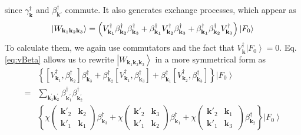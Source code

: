 \documentclass[aps,prb,superscriptaddress,showpacs,reprint,lengthcheck]{revtex4}
\newcommand{\vk}{\ensuremath{\mathbf{k}}}
\begin{document}
since $\gamma^{\dagger}_{\mathbf{k}}$ and $\beta^{\dagger}_{\mathbf{k}'}$ commute.  It also generates exchange processes, which appear as 
\begin{equation}
\left|W_{\mathbf{k} _1\mathbf{k} _2\mathbf{k} _3}\right> =\left(V^{\dagger}_{\mathbf{k} _1}\beta^{\dagger}_{\mathbf{k}
_2}\beta^{\dagger}_{\mathbf{k} _3}+\beta^{\dagger}_{\mathbf{k}
_1}V^{\dagger}_{\mathbf{k} _2}\beta^{\dagger}_{\mathbf{k} _3}+\beta^{%
\dagger}_{\mathbf{k} _1}\beta^{\dagger}_{\mathbf{k} _2}V^{\dagger}_{\mathbf{k%
} _3}\right) \left|F_0\right>  
\end{equation}
To calculate them, we again use commutators and the fact that $V^{\dagger}_\vk\left|F_0\right>  =0$. 
Eq. \eqref{eq:vBeta} allows us to rewrite  $\left|W_{\mathbf{k} _1\mathbf{k} _2\mathbf{k} _3}\right>$ in a more symmetrical form as
\begin{equation}  \label{eq:vThree2}
\begin{split}
&\left\{\left[V^{\dagger}_{\mathbf{k} _1},\beta^{\dagger}_{\mathbf{k} _2}%
\right]  \beta^{\dagger}_{\mathbf{k} _3}+\beta^{\dagger}_{\mathbf{k} _2}%
\left[V^{\dagger}_{\mathbf{k} _1},\beta^{\dagger}_{\mathbf{k} _3}\right] 
+\beta^{\dagger}_{\mathbf{k} _1}\left[V^{\dagger}_{\mathbf{k}
_2},\beta^{\dagger}_{\mathbf{k} _3}\right]  \right\} \left|F_0\right>   \\
=&\sum_{\vk^{\prime}_1\mathbf{k} ^{\prime}_2}\beta^{\dagger}_{\mathbf{k}
^{\prime}_1}\beta^{\dagger}_{\mathbf{k} ^{\prime}_2} \\
&\left\{\chi\left(\begin{smallmatrix}\vk'_2&\vk_2\\\vk'_1&\vk_1%
\end{smallmatrix}\right)  \beta^{\dagger}_{\mathbf{k} _3}+\chi\left(%
\begin{smallmatrix}\vk'_2&\vk_3\\\vk'_1&\vk_2\end{smallmatrix}\right) 
\beta^{\dagger}_{\mathbf{k} _1}+\chi\left(\begin{smallmatrix}\vk'_2&\vk_1\
\\\vk'_1&\vk_3\end{smallmatrix}\right)  \beta^{\dagger}_{\mathbf{k}
_2}\right\} \left|F_0\right>  
\end{split}%
\end{equation}
\end{document}
